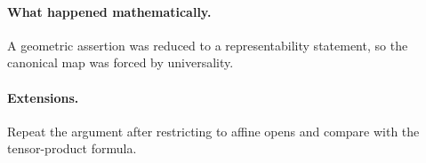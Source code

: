 \paragraph{What happened mathematically.}
A geometric assertion was reduced to a representability statement, so the canonical map was forced by universality.

\paragraph{Extensions.}
Repeat the argument after restricting to affine opens and compare with the tensor-product formula.
\fi
